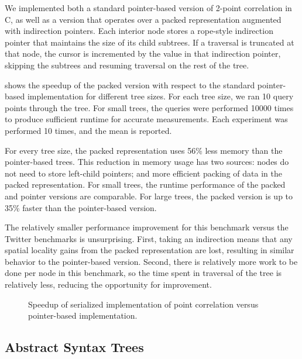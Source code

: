 \documentclass[showabstract,showacknowledgments,showpreface,showdedication]{iuphd}
\theoremstyle{nonumberplain}
\begin{document}
We implemented both a standard pointer-based version of 2-point correlation in
C, as well as a version that operates over a packed representation augmented
with indirection pointers. Each interior node stores a rope-style
indirection pointer that maintains the size of its child subtrees. If a
traversal is truncated at that node, the cursor is incremented by the value in
that indirection pointer, skipping the subtrees and resuming traversal on the
rest of the tree.

 shows the speedup of the packed version
with respect to the standard pointer-based implementation for
different tree sizes. For each tree size, we ran 10 query points
through the tree. For small trees, the queries were performed 10000
times to produce sufficient runtime for accurate measurements. Each
experiment was performed 10 times, and the mean is reported.

For every tree size, the packed representation uses 56\% less memory
than the pointer-based trees. This reduction in memory usage has two
sources: nodes do not need to store left-child pointers; and more
efficient packing of data in the packed representation. For small
trees, the runtime performance of the packed and pointer versions are
comparable. For large trees, the packed version is up to 35\% faster
than the pointer-based version. 

The relatively smaller performance improvement for this
benchmark versus the Twitter benchmarks is unsurprising. First, taking an
indirection means that any spatial locality gains from the packed
representation are lost, resulting in similar behavior to the
pointer-based version. Second, there is relatively more work to be
done per node in this benchmark, so the time spent in traversal of the
tree is relatively less, reducing the opportunity for improvement.


\begin{figure}
  \centering
  
  \label{fig:point_corr_plot}
  \caption{Speedup of serialized implementation of point correlation versus
    pointer-based implementation.}
\end{figure}

\subsection{Abstract Syntax Trees}

\end{document}
